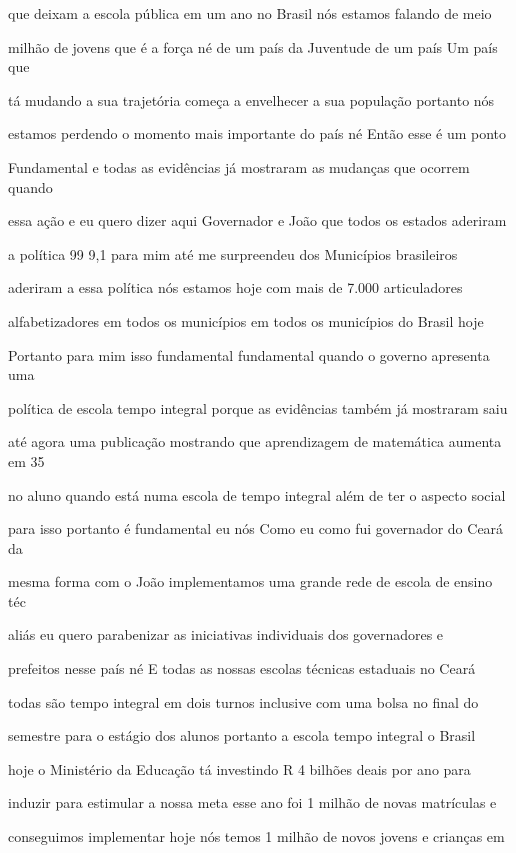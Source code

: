 \documentclass[a4paper,12pt]{article}
\begin{document}
que deixam a escola pública em um ano no Brasil nós estamos falando de meio

milhão de jovens que é a força né de um país da Juventude de um país Um país que

tá mudando a sua trajetória começa a envelhecer a sua população portanto nós

estamos perdendo o momento mais importante do país né Então esse é um ponto

Fundamental e todas as evidências já mostraram as mudanças que ocorrem quando

essa ação e eu quero dizer aqui Governador e João que todos os estados aderiram

a política 99 9,1 para mim até me surpreendeu dos Municípios brasileiros

aderiram a essa política nós estamos hoje com mais de 7.000 articuladores

alfabetizadores em todos os municípios em todos os municípios do Brasil hoje

Portanto para mim isso fundamental fundamental quando o governo apresenta uma

política de escola tempo integral porque as evidências também já mostraram saiu

até agora uma publicação mostrando que aprendizagem de matemática aumenta em 35%

no aluno quando está numa escola de tempo integral além de ter o aspecto social

para isso portanto é fundamental eu nós Como eu como fui governador do Ceará da

mesma forma com o João implementamos uma grande rede de escola de ensino téc

aliás eu quero parabenizar as iniciativas individuais dos governadores e

prefeitos nesse país né E todas as nossas escolas técnicas estaduais no Ceará

todas são tempo integral em dois turnos inclusive com uma bolsa no final do

semestre para o estágio dos alunos portanto a escola tempo integral o Brasil

hoje o Ministério da Educação tá investindo R 4 bilhões deais por ano para

induzir para estimular a nossa meta esse ano foi 1 milhão de novas matrículas e

conseguimos implementar hoje nós temos 1 milhão de novos jovens e crianças em
\end{document}
